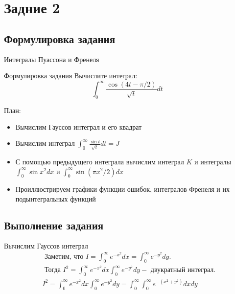 \section{Задние 2}
\subsection{Формулировка задания}
\begin{frame}{Интегралы Пуассона и Френеля}  %
\begin{block}{Формулировка задания}
Вычислите интеграл:
$$
\int_{0}^{\infty} \frac{\cos (4 t-\pi / 2)}{\sqrt{t}} d t
$$
\end{block}
\begin{block}{План:}
\begin{itemize}
    \item Вычислим Гауссов интеграл и его квадрат
    \item Вычислим интеграл $\int_{0}^{\infty} \frac{\sin t}{\sqrt{t}} d t=J$
    \item С помощью предыдущего интеграла вычислим интеграл $K$ и интегралы $\int_{0}^{\infty} \sin x^{2} d x$ и $\int_{0}^{\infty} \sin \left(\pi x^{2} / 2\right) d x$
    \item Проиллюстрируем графики функции ошибок, интегралов Френеля и их подынтегральных функций
\end{itemize}
\end{block}
\end{frame}

\subsection{Выполнение задания}
\begin{frame}{Вычислим Гауссов интеграл}
\begin{align*}
&\text { Заметим, что } I=\int_{0}^{\infty} e^{-x^{2}} d x=\int_{0}^{\infty} e^{-y^{2}} d y .\\
&\text { Тогда } I^{2}=\int_{0}^{\infty} e^{-x^{2}} d x \int_{0}^{\infty} e^{-y^{2}} d y-\text { двукратный интеграл. }\\
&I^{2}=\int_{0}^{\infty} e^{-x^{2}} d x \int_{0}^{\infty} e^{-y^{2}} d y=\int_{0}^{\infty} \int_{0}^{\infty} e^{-\left(x^{2}+y^{2}\right)} d x d y
\end{align*}
\end{frame}

